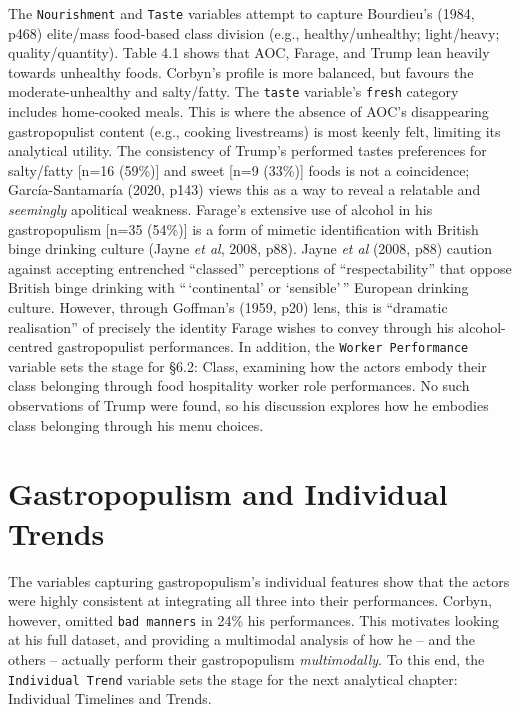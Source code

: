 \documentclass[a4paper, nobind]{templates/ociamthesis}
\begin{document}
The \texttt{Nourishment} and \texttt{Taste} variables attempt to capture Bourdieu's (1984, p468) elite/mass food-based class division (e.g., healthy/unhealthy; light/heavy; quality/quantity). Table 4.1 shows that AOC, Farage, and Trump lean heavily towards unhealthy foods. Corbyn's profile is more balanced, but favours the moderate-unhealthy and salty/fatty. The \texttt{taste} variable's \texttt{fresh} category includes home-cooked meals. This is where the absence of AOC's disappearing gastropopulist content (e.g., cooking livestreams) is most keenly felt, limiting its analytical utility. The consistency of Trump's performed tastes preferences for salty/fatty {[}n=16 (59\%){]} and sweet {[}n=9 (33\%){]} foods is not a coincidence; García-Santamaría (2020, p143) views this as a way to reveal a relatable and \emph{seemingly} apolitical weakness. Farage's extensive use of alcohol in his gastropopulism {[}n=35 (54\%){]} is a form of mimetic identification with British binge drinking culture (Jayne \emph{et al}, 2008, p88). Jayne \emph{et al} (2008, p88) caution against accepting entrenched ``classed'' perceptions of ``respectability'' that oppose British binge drinking with ``\,`continental' or `sensible'\,'' European drinking culture. However, through Goffman's (1959, p20) lens, this is ``dramatic realisation'' of precisely the identity Farage wishes to convey through his alcohol-centred gastropopulist performances. In addition, the \texttt{Worker\ Performance} variable sets the stage for §6.2: Class, examining how the actors embody their class belonging through food hospitality worker role performances. No such observations of Trump were found, so his discussion explores how he embodies class belonging through his menu choices.

\hypertarget{gastropopulism-and-individual-trends}{%
\section*{Gastropopulism and Individual Trends}\label{gastropopulism-and-individual-trends}}

The variables capturing gastropopulism's individual features show that the actors were highly consistent at integrating all three into their performances. Corbyn, however, omitted \texttt{bad\ manners} in 24\% his performances. This motivates looking at his full dataset, and providing a multimodal analysis of how he -- and the others -- actually perform their gastropopulism \emph{multimodally}. To this end, the \texttt{Individual\ Trend} variable sets the stage for the next analytical chapter: Individual Timelines and Trends.
\end{document}
